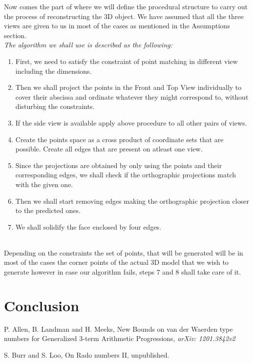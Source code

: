 \documentclass[12pt]{report}
\begin{document}
Now comes the part of where we will define the procedural structure to carry out the process of reconstructing the 3D object. We have assumed that all the three views are given to us in most of the cases as mentioned in the Assumptions section.
\\
\vspace{0.2cm}
\textit{The algorithm we shall use is described as the following:}
\\
\begin{enumerate}
  \item
  First, we need to satisfy the constraint of point matching in different view including the dimensions.
  \item
  Then we shall project the points in the Front and Top View individually to cover their abscissa and ordinate whatever they might correspond to, without disturbing the constraints.
  \item
  If the side view is available apply above procedure to all other pairs of views. 
  \item
  Create the points space as a cross product of coordinate sets that are possible. Create all edges that are present on atleast one view.
  \item
  Since the projections are obtained by only using the points and their corresponding edges, we shall check if the orthographic projections match with the given one.
  \item
  Then we shall start removing edges making the orthographic projection closer to the predicted ones.
  \item
  We shall solidify the face enclosed by four edges.
\end{enumerate}
  
\\
Depending on the constraints the set of points, that will be generated will be in most of the cases the corner points of the actual 3D model that we wish to generate however in case our algorithm fails, steps 7 and 8 shall take care of it. 


\chapter{Conclusion}

\begin{thebibliography}{9}


P. Allen, B. Landman and H. Meeks, New Bounds on van der Waerden type numbers for Generalized $3$-term Arithmetic Progressions, {\it arXiv: 1201.3842v2}


S. Burr and S. Loo, On Rado numbers II, unpublished.

\end{thebibliography}
\end{document}
